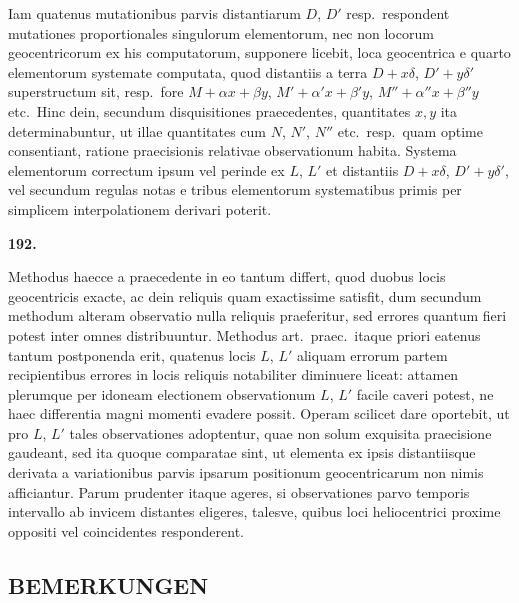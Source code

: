 \documentclass[11pt,a4paper]{article}
\begin{document}
Iam quatenus mutationibus parvis distantiarum $D$, $D'$ resp.\ respondent mutationes proportionales singulorum elementorum, nec non locorum geocentricorum ex his computatorum, supponere licebit, loca geocentrica e quarto elementorum systemate computata, quod distantiis a terra $D + x\delta$, $D' + y\delta'$ superstructum sit, resp.\ fore $M + \alpha x + \beta y$, $M' + \alpha' x + \beta' y$, $M'' + \alpha''x + \beta''y$ etc.\ Hinc dein, secundum disquisitiones praecedentes, quantitates $x, y$ ita determinabuntur, ut illae quantitates cum $N$, $N'$, $N''$ etc.\ resp.\ quam optime consentiant, ratione praecisionis relativae observationum habita. Systema elementorum correctum ipsum vel perinde ex $L$, $L'$ et distantiis $D + x\delta$, $D' + y\delta'$, vel secundum regulas notas e tribus elementorum systematibus primis per simplicem interpolationem derivari poterit.

\vspace{1em}

\noindent\textbf{192.}

Methodus haecce a praecedente in eo tantum differt, quod duobus locis geocentricis exacte, ac dein reliquis quam exactissime satisfit, dum secundum methodum alteram observatio nulla reliquis praeferitur, sed errores quantum fieri potest inter omnes distribuuntur. Methodus art.\ praec.\ itaque priori eatenus tantum postponenda erit, quatenus locis $L$, $L'$ aliquam errorum partem recipientibus errores in locis reliquis notabiliter diminuere liceat: attamen plerumque per idoneam electionem observationum $L$, $L'$ facile caveri potest, ne haec differentia magni momenti evadere possit. Operam scilicet dare oportebit, ut pro $L$, $L'$ tales observationes adoptentur, quae non solum exquisita praecisione gaudeant, sed ita quoque comparatae sint, ut elementa ex ipsis distantiisque derivata a variationibus parvis ipsarum positionum geocentricarum non nimis afficiantur. Parum prudenter itaque ageres, si observationes parvo temporis intervallo ab invicem distantes eligeres, talesve, quibus loci heliocentrici proxime oppositi vel coincidentes responderent.

\newpage
\setcounter{page}{262}

\begin{center}
\section*{BEMERKUNGEN}
\end{center}
\end{document}
